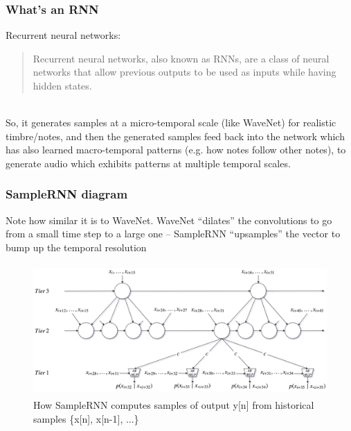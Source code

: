 \documentclass{beamer}
\begin{document}
\begin{frame}
	\frametitle{What's an RNN}
	Recurrent neural networks:
	\begin{quote}
		Recurrent neural networks, also known as RNNs, are a class of neural networks that allow previous outputs to be used as inputs while having hidden states.
	\end{quote}\\
	So, it generates samples at a micro-temporal scale (like WaveNet) for realistic timbre/notes, and then the generated samples feed back into the network which has also learned macro-temporal patterns (e.g. how notes follow other notes), to generate audio which exhibits patterns at multiple temporal scales.\\
\end{frame}


\begin{frame}
	\frametitle{SampleRNN diagram}
	Note how similar it is to WaveNet. WaveNet ``dilates'' the convolutions to go from a small time step to a large one  -- SampleRNN ``upsamples'' the vector to bump up the temporal resolution
	\begin{figure}
	\includegraphics[height=5cm]{./8_samplernn.png}
		\caption{How SampleRNN computes samples of output y[n] from historical samples \{x[n], x[n-1], ...\}}
	\end{figure}
\end{frame}
\end{document}
